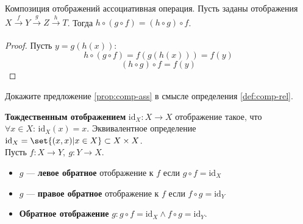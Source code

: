 \documentclass{article}
\begin{document}
\begin{proposition}
    \label{prop:comp-ass}
    Композиция отображений ассоциативная операция. Пусть заданы отображения \(X \xrightarrow[]{f} Y \xrightarrow[]{g} Z \xrightarrow[]{h} T\). Тогда \(h \circ (g \circ f) = (h \circ g) \circ f\).
\end{proposition}
\begin{proof}
    Пусть \(y = g(h(x))\):
    \[h \circ (g \circ f)  = f(g(h(x))) = f(y)\]
    \[(h \circ g) \circ f = f(y)\]
\end{proof}

\begin{?}
    Докажите предложение \ref{prop:comp-ass} в смысле определения \ref{def:comp-rel}.
\end{?}

\begin{definition}
    \label{def:inverse-map}
    \textbf{Тождественным отображением} \(\mathrm{id}_X: X \rightarrow X\) отображение такое, что \(\forall x \in X:\, \mathrm{id}_X(x) = x\). Эквивалентное определение \(\mathrm{id}_X = \set{(x, x) | x \in X} \subset X \times X\).    \\
    Пусть \(f: X \rightarrow Y,\ g: Y \rightarrow X\).
    \begin{itemize}
        \item \(g\) --- \textbf{левое обратное} отображение к \(f\) если \(g \circ f = \mathrm{id}_X\)
        \item \(g\) --- \textbf{правое обратное} отображение к \(f\) если \(f \circ g = \mathrm{id}_Y\)
        \item \textbf{Обратное отображение} \(g: g \circ f = \mathrm{id}_X \land f \circ g = \mathrm{id}_Y\).
    \end{itemize}
\end{definition}
\end{document}
